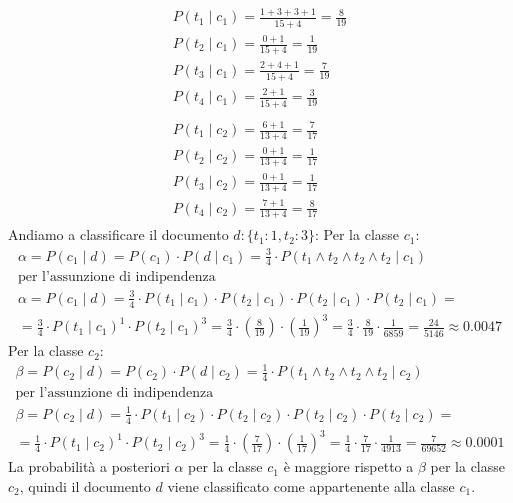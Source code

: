 \documentclass{report}
\begin{document}
\begin{tcolorbox}[title=Esercizio di esempio]
\[\begin{array}{l}
\begin{array}{l}
						P(t_1 \mid c_1) = \frac{1+3+3+1}{15+4} = \frac{8}{19} \\
						P(t_2 \mid c_1) = \frac{0+1}{15+4} = \frac{1}{19} \\
						P(t_3 \mid c_1) = \frac{2+4+1}{15+4} = \frac{7}{19} \\
						P(t_4 \mid c_1) = \frac{2+1}{15+4} = \frac{3}{19} \\\\
						P(t_1 \mid c_2) = \frac{6+1}{13+4} = \frac{7}{17} \\
						P(t_2 \mid c_2) = \frac{0+1}{13+4} = \frac{1}{17} \\
						P(t_3 \mid c_2) = \frac{0+1}{13+4} = \frac{1}{17} \\
						P(t_4 \mid c_2) = \frac{7+1}{13+4} = \frac{8}{17}
					\end{array}
				\end{array}
			\]
			Andiamo a classificare il documento $d: \{t_1: 1, t_2:3\}$:
			Per la classe $c_1$:
			\[
				\begin{array}{l}
					\alpha = P(c_1 \mid d) = P(c_1) \cdot P(d \mid c_1) = \frac{3}{4} \cdot P(t_1 \land t_2 \land t_2 \land t_2 \mid c_1)\\
					\text{per l'assunzione di indipendenza} \\
					\alpha = P(c_1 \mid d) = \frac{3}{4} \cdot P(t_1 \mid c_1) \cdot P(t_2 \mid c_1) \cdot P(t_2 \mid c_1) \cdot P(t_2 \mid c_1) = \\ = \frac{3}{4} \cdot P(t_1 \mid c_1)^1 \cdot P(t_2 \mid c_1)^3 = \frac{3}{4} \cdot \left(\frac{8}{19}\right) \cdot \left(\frac{1}{19}\right)^3 = \frac{3}{4} \cdot \frac{8}{19} \cdot \frac{1}{6859} = \frac{24}{5146} \approx 0.0047
				\end{array}
			\]
			Per la classe $c_2$:
			\[
				\begin{array}{l}
					\beta = P(c_2 \mid d) = P(c_2) \cdot P(d \mid c_2) = \frac{1}{4} \cdot P(t_1 \land t_2 \land t_2 \land t_2 \mid c_2)\\
					\text{per l'assunzione di indipendenza} \\
					\beta = P(c_2 \mid d) = \frac{1}{4} \cdot P(t_1 \mid c_2) \cdot P(t_2 \mid c_2) \cdot P(t_2 \mid c_2) \cdot P(t_2 \mid c_2) =\\= \frac{1}{4} \cdot P(t_1 \mid c_2)^1 \cdot P(t_2 \mid c_2)^3 = \frac{1}{4} \cdot \left(\frac{7}{17}\right) \cdot \left(\frac{1}{17}\right)^3 = \frac{1}{4} \cdot \frac{7}{17} \cdot \frac{1}{4913} = \frac{7}{69652} \approx 0.0001
				\end{array}
			\]
			La probabilità a posteriori $\alpha$ per la classe $c_1$ è maggiore rispetto a $\beta$ per la classe $c_2$, quindi il documento $d$ viene classificato come appartenente alla classe $c_1$.
	\end{tcolorbox}
\end{document}

